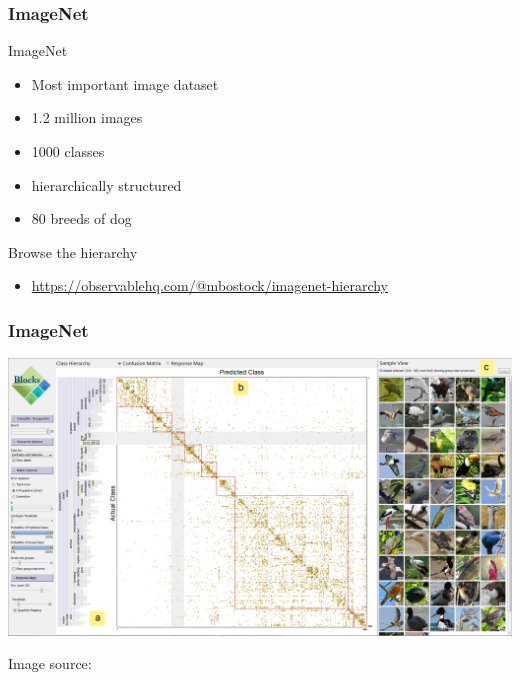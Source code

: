 \begin{frame}
\frametitle{ImageNet}

ImageNet
\begin{itemize}
\item Most important image dataset
\item 1.2 million images
\item 1000 classes
\item hierarchically structured
\item 80 breeds of dog
\end{itemize}

\vspace{0.25in}
Browse the hierarchy
\begin{itemize}
\item
\url{https://observablehq.com/@mbostock/imagenet-hierarchy}
\end{itemize}

\end{frame}


\begin{frame}
\frametitle{ImageNet}

\includegraphics[width=\textwidth]{img/teaser}

{\tiny Image source: \citet{bilal2018}}
\end{frame}

